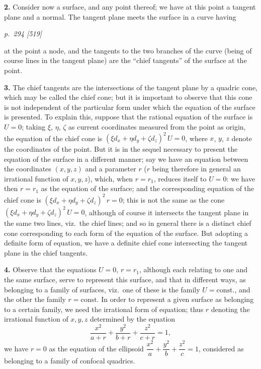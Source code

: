 \documentclass[11pt,a4paper]{article}
\theoremstyle{plain}
\begin{document}
\textbf{2.} Consider now a surface, and any point thereof; we have at this point a
tangent plane and a normal.  The tangent plane meets the surface in a curve having

\bigskip
\textit{p.~294 [519]}
\smallskip

\noindent at the point a node, and the tangents to the two branches of the curve (being of
course lines in the tangent plane) are the ``chief tangents'' of the surface at the point.

\textbf{3.} The chief tangents are the intersections of the tangent plane by a quadric cone,
which may be called the chief cone; but it is important to observe that this cone
is not independent of the particular form under which the equation of the surface is
presented.  To explain this, suppose that the rational equation of the surface is $U=0$;
taking $\xi$, $\eta$, $\zeta$ as current coordinates measured from the point as origin, the equation
of the chief cone is $(\xi d_x + \eta d_y + \zeta d_z)^2\, U = 0$, where $x$, $y$, $z$ denote the coordinates of the
point.  But it is in the sequel necessary to present the equation of the surface in a
different manner; say we have an equation between the coordinates $(x, y, z)$ and a
parameter $r$ ($r$ being therefore in general an irrational function of $x, y, z$), which, when
$r = r_1$, reduces itself to $U = 0$: we have then $r = r_1$ as the equation of the surface;
and the corresponding equation of the chief cone is $(\xi d_x + \eta d_y + \zeta d_z)^2\, r = 0$; this is not
the same as the cone $(\xi d_x + \eta d_y + \zeta d_z)^2\, U = 0$, although of course it intersects the tangent
plane in the same two lines, viz.\ the chief lines; and so in general there is a distinct
chief cone corresponding to each form of the equation of the surface.  But adopting
a definite form of equation, we have a definite chief cone intersecting the tangent
plane in the chief tangents.

\textbf{4.} Observe that the equations $U = 0$, $r = r_1$, although each relating to one and
the same surface, serve to represent this surface, and that in different ways, as belonging
to a family of surfaces, viz.\ one of these is the family $U = \mathrm{const.}$, and the other the
family $r = \mathrm{const.}$  In order to represent a given surface as belonging to a certain
family, we need the irrational form of equation; thus $r$ denoting the irrational function
of $x, y, z$ determined by the equation
\[
\frac{x^2}{a + r} + \frac{y^2}{b + r} + \frac{z^2}{c + r} = 1,
\]
we have $r = 0$ as the equation of the ellipsoid $\dfrac{x^2}{a} + \dfrac{y^2}{b} + \dfrac{z^2}{c} = 1$, considered as belonging to a family of confocal
quadrics.
\end{document}
